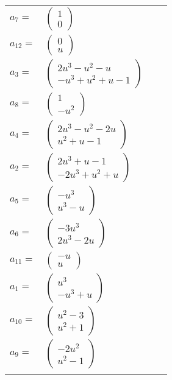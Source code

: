 \documentclass[1p]{elsarticle_modified}
\theoremstyle{definition}
\begin{document}
\begin{tabular}{m{7pt} m{180pt} m{7pt} m{180pt} }
\flushright $a_{7}=$&$\begin{pmatrix}1\\0\end{pmatrix}$ \\
\flushright $a_{12}=$&$\begin{pmatrix}0\\u\end{pmatrix}$ \\
\flushright $a_{3}=$&$\begin{pmatrix}2 u^3- u^2- u\\- u^3+u^2+u-1\end{pmatrix}$ \\
\flushright $a_{8}=$&$\begin{pmatrix}1\\- u^2\end{pmatrix}$ \\
\flushright $a_{4}=$&$\begin{pmatrix}2 u^3- u^2-2 u\\u^2+u-1\end{pmatrix}$ \\
\flushright $a_{2}=$&$\begin{pmatrix}2 u^3+u-1\\-2 u^3+u^2+u\end{pmatrix}$ \\
\flushright $a_{5}=$&$\begin{pmatrix}- u^3\\u^3- u\end{pmatrix}$ \\
\flushright $a_{6}=$&$\begin{pmatrix}-3 u^3\\2 u^3-2 u\end{pmatrix}$ \\
\flushright $a_{11}=$&$\begin{pmatrix}- u\\u\end{pmatrix}$ \\
\flushright $a_{1}=$&$\begin{pmatrix}u^3\\- u^3+u\end{pmatrix}$ \\
\flushright $a_{10}=$&$\begin{pmatrix}u^2-3\\u^2+1\end{pmatrix}$ \\
\flushright $a_{9}=$&$\begin{pmatrix}-2 u^2\\u^2-1\end{pmatrix}$\\&\end{tabular}
\end{document}
